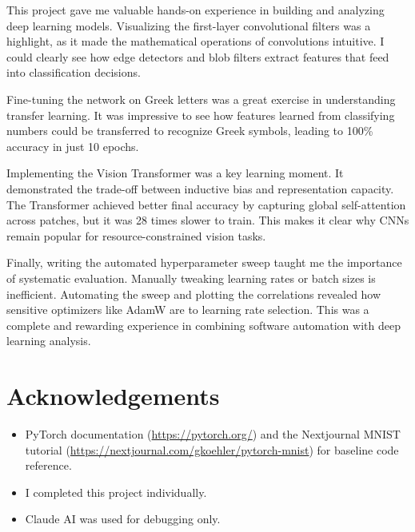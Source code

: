 \documentclass[11pt,letterpaper]{article}
\begin{document}
This project gave me valuable hands-on experience in building and analyzing deep learning models. Visualizing the first-layer convolutional filters was a highlight, as it made the mathematical operations of convolutions intuitive. I could clearly see how edge detectors and blob filters extract features that feed into classification decisions.

Fine-tuning the network on Greek letters was a great exercise in understanding transfer learning. It was impressive to see how features learned from classifying numbers could be transferred to recognize Greek symbols, leading to 100\% accuracy in just 10 epochs.

Implementing the Vision Transformer was a key learning moment. It demonstrated the trade-off between inductive bias and representation capacity. The Transformer achieved better final accuracy by capturing global self-attention across patches, but it was 28 times slower to train. This makes it clear why CNNs remain popular for resource-constrained vision tasks.

Finally, writing the automated hyperparameter sweep taught me the importance of systematic evaluation. Manually tweaking learning rates or batch sizes is inefficient. Automating the sweep and plotting the correlations revealed how sensitive optimizers like AdamW are to learning rate selection. This was a complete and rewarding experience in combining software automation with deep learning analysis.

\section*{Acknowledgements}

\begin{itemize}
    \item PyTorch documentation (\url{https://pytorch.org/}) and the Nextjournal MNIST tutorial (\url{https://nextjournal.com/gkoehler/pytorch-mnist}) for baseline code reference.
    \item I completed this project individually.
    \item Claude AI was used for debugging only.
\end{itemize}
\end{document}
